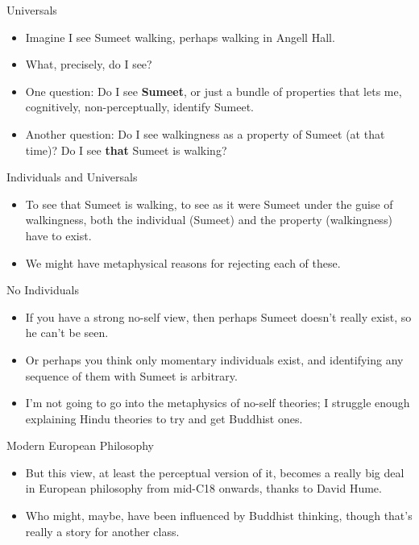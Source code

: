 \documentclass[
  17pt,
  letterpaper,
  ignorenonframetext,
  aspectratio=169,
]{beamer}
\providecommand{\tightlist}{%
  \setlength{\itemsep}{0pt}\setlength{\parskip}{0pt}}\usepackage{longtable,booktabs,array}
\begin{document}
\begin{frame}{Universals}
\protect\hypertarget{universals}{}
\begin{itemize}[<+->]
\tightlist
\item
  Imagine I see Sumeet walking, perhaps walking in Angell Hall.
\item
  What, precisely, do I see?
\item
  One question: Do I see \textbf{Sumeet}, or just a bundle of properties
  that lets me, cognitively, non-perceptually, identify Sumeet.
\item
  Another question: Do I see walkingness as a property of Sumeet (at
  that time)? Do I see \textbf{that} Sumeet is walking?
\end{itemize}
\end{frame}

\begin{frame}{Individuals and Universals}
\protect\hypertarget{individuals-and-universals}{}
\begin{itemize}[<+->]
\tightlist
\item
  To see that Sumeet is walking, to see as it were Sumeet under the
  guise of walkingness, both the individual (Sumeet) and the property
  (walkingness) have to exist.
\item
  We might have metaphysical reasons for rejecting each of these.
\end{itemize}
\end{frame}

\begin{frame}{No Individuals}
\protect\hypertarget{no-individuals}{}
\begin{itemize}[<+->]
\tightlist
\item
  If you have a strong no-self view, then perhaps Sumeet doesn't really
  exist, so he can't be seen.
\item
  Or perhaps you think only momentary individuals exist, and identifying
  any sequence of them with Sumeet is arbitrary.
\item
  I'm not going to go into the metaphysics of no-self theories; I
  struggle enough explaining Hindu theories to try and get Buddhist
  ones.
\end{itemize}
\end{frame}

\begin{frame}{Modern European Philosophy}
\protect\hypertarget{modern-european-philosophy}{}
\begin{itemize}[<+->]
\tightlist
\item
  But this view, at least the perceptual version of it, becomes a really
  big deal in European philosophy from mid-C18 onwards, thanks to David
  Hume.
\item
  Who might, maybe, have been influenced by Buddhist thinking, though
  that's really a story for another class.
\end{itemize}
\end{frame}
\end{document}
